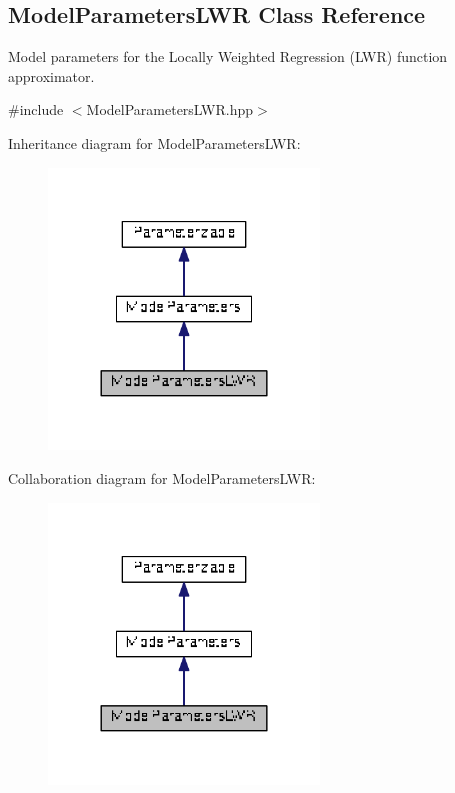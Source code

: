 \hypertarget{classDmpBbo_1_1ModelParametersLWR}{\subsection{Model\+Parameters\+L\+W\+R Class Reference}
\label{classDmpBbo_1_1ModelParametersLWR}
}


Model parameters for the Locally Weighted Regression (L\+W\+R) function approximator.  




{\ttfamily \#include $<$Model\+Parameters\+L\+W\+R.\+hpp$>$}



Inheritance diagram for Model\+Parameters\+L\+W\+R\+:
\nopagebreak
\begin{figure}[H]
\begin{center}
\leavevmode
\includegraphics[width=204pt]{classDmpBbo_1_1ModelParametersLWR__inherit__graph}
\end{center}
\end{figure}


Collaboration diagram for Model\+Parameters\+L\+W\+R\+:
\nopagebreak
\begin{figure}[H]
\begin{center}
\leavevmode
\includegraphics[width=204pt]{classDmpBbo_1_1ModelParametersLWR__coll__graph}
\end{center}
\end{figure}
